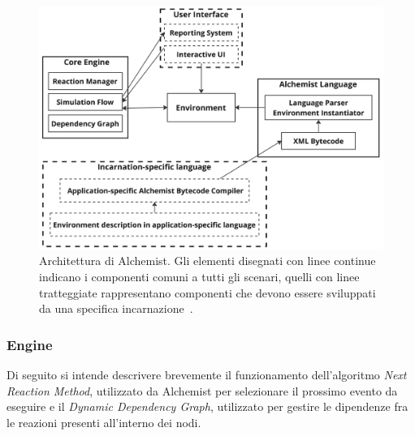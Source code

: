 \documentclass[12pt,a4paper,openright,twoside]{book}
\begin{document}
\begin{figure}
    \centering
    \includegraphics[width=.85\linewidth]{figures/discrete-event-simulation/alchemist-architecture.jpg}
    \caption{Architettura di Alchemist. Gli elementi disegnati con linee continue indicano i componenti comuni a tutti gli scenari, quelli con linee tratteggiate rappresentano componenti che devono essere sviluppati da una specifica incarnazione~\cite{DBLP:journals/jos/PianiniMV13}.}
    \label{fig:alchemist-architecture}
\end{figure}

\subsubsection{Engine}
Di seguito si intende descrivere brevemente il funzionamento dell'algoritmo \textit{Next Reaction Method}, utilizzato da Alchemist per selezionare il prossimo evento da eseguire e il \textit{Dynamic Dependency Graph}, utilizzato per gestire le dipendenze fra le reazioni presenti all'interno dei nodi. 
\end{document}

